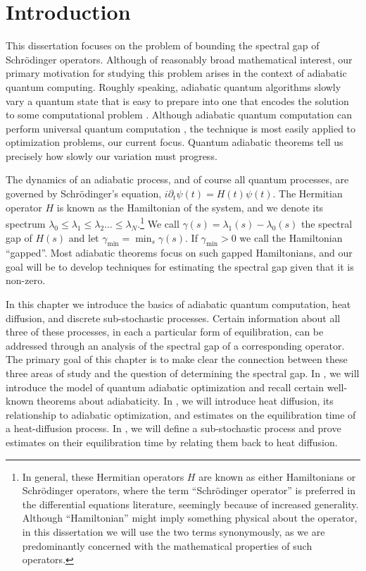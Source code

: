 \let\oldrVert\rVert
\let\oldlVert\lVert

\renewcommand{\lVert}{\left\oldlVert}
\renewcommand{\rVert}{\right\oldrVert}

\chapter{Introduction}

This dissertation focuses on the problem of bounding the spectral gap of Schr\"{o}dinger operators. Although of reasonably broad mathematical interest, our primary motivation for studying this problem arises in the context of adiabatic quantum computing. Roughly speaking, adiabatic quantum algorithms slowly vary a quantum state that is easy to prepare into one that encodes the solution to some computational problem \cite{Farhi_science}. Although adiabatic quantum computation can perform universal quantum computation \cite{ADKLLR07}, the technique is most easily applied to optimization problems, our current focus. Quantum adiabatic theorems tell us precisely how slowly our variation must progress.

The dynamics of an adiabatic process, and of course all quantum processes, are governed by Schr\"{o}dinger's equation, $i \partial_t \psi(t) = H(t) \psi(t)$. The Hermitian operator $H$ is known as the Hamiltonian of the system, and we denote its spectrum $\lambda_0 \leq \lambda_1 \leq \lambda_2 \dots \leq \lambda_N$.\footnote{In general, these Hermitian operators $H$ are known as either Hamiltonians or Schr\"{o}dinger operators, where the term ``Schr\"{o}dinger operator'' is preferred in the differential equations literature, seemingly because of increased generality. Although ``Hamiltonian'' might imply something physical about the operator, in this dissertation we will use the two terms synonymously, as we are predominantly concerned with the mathematical properties of such operators.} We call $\gamma(s) = \lambda_1(s) - \lambda_0(s)$ the spectral gap of $H(s)$ and let $\gamma_\min = \min_s \gamma(s)$. If $\gamma_\min > 0$ we call the Hamiltonian ``gapped''. Most adiabatic theorems focus on such gapped Hamiltonians, and our goal will be to develop techniques for estimating the spectral gap given that it is non-zero.

In this chapter we introduce the basics of adiabatic quantum computation, heat diffusion, and discrete sub-stochastic processes. Certain information about all three of these processes, in each a particular form of equilibration, can be addressed through an analysis of the spectral gap of a corresponding operator. The primary goal of this chapter is to make clear the connection between these three areas of study and the question of determining the spectral gap. In , we will introduce the model of quantum adiabatic optimization and recall certain well-known theorems about adiabaticity. In , we will introduce heat diffusion, its relationship to adiabatic optimization, and estimates on the equilibration time of a heat-diffusion process. In , we will define a sub-stochastic process and prove estimates on their equilibration time by relating them back to heat diffusion. 


